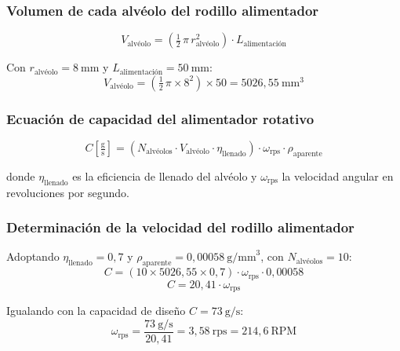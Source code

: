 \subsubsection{Volumen de cada alvéolo del rodillo alimentador}
\begin{equation}
V_{\text{alvéolo}} = \left(\tfrac{1}{2}\,\pi\, r_{\text{alvéolo}}^{2}\right) \cdot L_{\text{alimentación}}
\label{eq:Valveolo}
\end{equation}

Con $r_{\text{alvéolo}} = 8\ \text{mm}$ y $L_{\text{alimentación}} = 50\ \text{mm}$:
\begin{equation}
V_{\text{alvéolo}} = \left(\tfrac{1}{2}\,\pi \times 8^{2}\right) \times 50 = 5026{,}55\ \text{mm}^{3}
\end{equation}

\subsubsection{Ecuación de capacidad del alimentador rotativo}
\begin{equation}
C\left[\tfrac{\text{g}}{\text{s}}\right] = \left(N_{\text{alvéolos}} \cdot V_{\text{alvéolo}} \cdot \eta_{\text{llenado}}\right) \cdot \omega_{\text{rps}} \cdot \rho_{\text{aparente}}
\label{eq:Cap_alim}
\end{equation}

\noindent donde $\eta_{\text{llenado}}$ es la eficiencia de llenado del alvéolo y $\omega_{\text{rps}}$ la velocidad angular en revoluciones por segundo.

\subsubsection{Determinación de la velocidad del rodillo alimentador}
Adoptando $\eta_{\text{llenado}} = 0{,}7$ y $\rho_{\text{aparente}} = 0{,}00058\ \text{g/mm}^{3}$, con $N_{\text{alvéolos}} = 10$:
\begin{equation}
C = \left(10 \times 5026{,}55 \times 0{,}7\right) \cdot \omega_{\text{rps}} \cdot 0{,}00058
\end{equation}
\begin{equation}
C = 20{,}41 \cdot \omega_{\text{rps}}
\end{equation}

Igualando con la capacidad de diseño $C = 73\ \text{g/s}$:
\begin{equation}
\omega_{\text{rps}} = \frac{73\ \text{g/s}}{20{,}41} = 3{,}58\ \text{rps} = 214{,}6\ \text{RPM}
\label{eq:wrps}
\end{equation}

